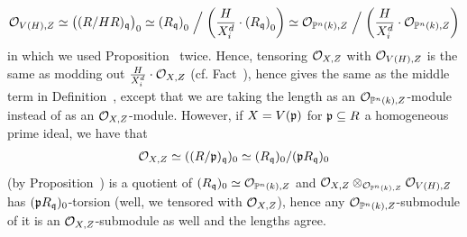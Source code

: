 \documentclass[a4paper,parskip=half,numbers=enddot, DIV=12]{scrreprt}
\begin{document}
\begin{rem}
\begin{alphanumerate}
        \begin{align*}
        	\mathcal{O}_{V(H),Z}\simeq\big((R/HR)_{\mathfrak{q}}\big)_0\simeq \left(R_{\mathfrak{q}}\right)_0\Bigm/\left(\frac{H}{X_i^d}\cdot \left(R_{\mathfrak{q}}\right)_0\right)\simeq \mathcal{O}_{\mathbb{P}^n(k),Z}\Bigm/\left(\frac{H}{X_i^d}\cdot \mathcal{O}_{\mathbb{P}^n(k),Z}\right)
        \end{align*}
        in which we used Proposition~ twice. Hence, tensoring $\mathcal{O}_{X,Z}$ with $\mathcal{O}_{V(H),Z}$ is the same as modding out $\frac{H}{X_i^d}\cdot \mathcal{O}_{X,Z}$ (cf. Fact~), hence gives the same as the middle term in Definition~, except that we are taking the length as an $\mathcal{O}_{\mathbb{P}^n(k),Z}$-module instead of as an $\mathcal{O}_{X,Z}$-module. However, if $X=V(\mathfrak{p})$ for $\mathfrak{p}\subseteq R$ a homogeneous prime ideal, we have that
        \begin{align*}
        	\mathcal{O}_{X,Z}\simeq ((R/\mathfrak{p})_{\mathfrak{q}})_0\simeq (R_{\mathfrak{q}})_0/(\mathfrak{p} R_{\mathfrak{q}})_0
        \end{align*}
        (by Proposition~) is a quotient of $(R_{\mathfrak{q}})_0\simeq\mathcal{O}_{\mathbb{P}^n(k),Z}$ and $\mathcal{O}_{X,Z}\otimes_{\mathcal{O}_{\mathbb{P}^n(k), Z}} \mathcal{O}_{V(H),Z}$ has $(\mathfrak{p} R_{\mathfrak{q}})_0$-torsion (well, we tensored with $\mathcal{O}_{X,Z}$), hence any $\mathcal{O}_{\mathbb{P}^n(k),Z}$-submodule of it is an $\mathcal{O}_{X,Z}$-submodule as well and the lengths agree.
    \end{alphanumerate}
\end{rem}
\end{document}
